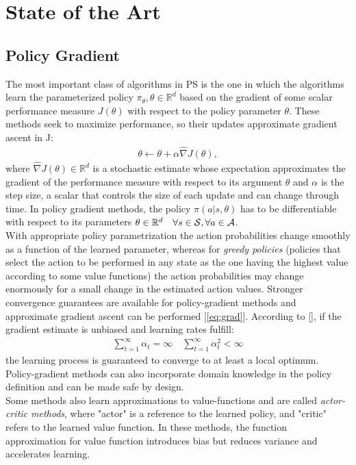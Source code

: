 \chapter{State of the Art} \label{chap:state}

\section{Policy Gradient}
The most important class of algorithms in \ac{PS} is the one in which the algorithms learn the parameterized policy $\pi_{\theta}, \theta \in \mathbb{R}^d$ based on the gradient of some scalar performance measure $J(\theta)$ with respect to the policy parameter $\theta$. These methods seek to maximize performance, so their updates approximate gradient ascent in J:
\begin{align}
\theta \leftarrow \theta + \alpha \widehat{\nabla}J(\theta), \label{eq:grad}
\end{align}
where $\widehat{\nabla}J(\theta) \in \mathbb{R}^d$ is a stochastic estimate whose expectation approximates the gradient of the performance measure with respect to its argument $\theta$ and $\alpha$ is the step size, a scalar that controls the size of each update and can change through time. In policy gradient methods, the policy $\pi(a|s,\theta)$ has to be differentiable with respect to its parameters $\theta \in \mathbb{R}^d \quad \forall s \in \mathcal{S}, \forall a \in \mathcal{A}$.\\
\newline
With appropriate policy parametrization the action probabilities change smoothly as a function of the learned parameter, whereas for \emph{greedy policies} (\ie policies that select the action to be performed in any state as the one having the highest value according to some value functions) the action probabilities may change enormously for a small change in the estimated action values. Stronger convergence guarantees are available for policy-gradient methods and approximate gradient ascent can be performed [\ref{eq:grad}]. According to [\cite{Peters2008ReinforcementLO}], if the gradient estimate is unbiased and learning rates fulfill:
\begin{align}\sum_{t=1}^{\infty}\alpha_t = \infty \quad \sum_{t=1}^{\infty}\alpha_t^2 < \infty\end{align} 
the learning process is guaranteed to converge to at least a local optimum. Policy-gradient methods can also incorporate domain knowledge in the policy definition and can be made safe by design.\\
\newline
Some methods also learn approximations to value-functions and are called \emph{actor-critic methods}, where "actor" is a reference to the learned policy, and "critic" refers to the learned value function. In these methods, the function approximation for value function introduces bias but reduces variance and accelerates learning.

